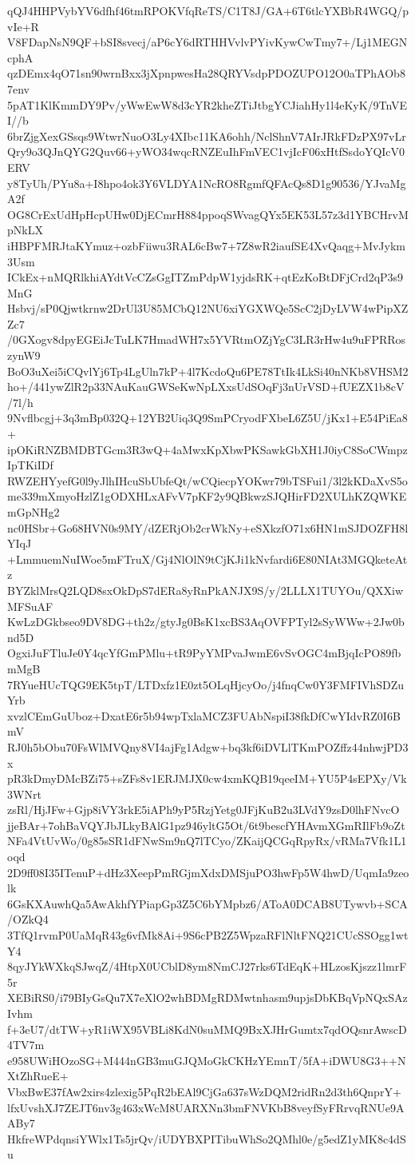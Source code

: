 qQJ4HHPVybYV6dfhf46tmRPOKVfqReTS/C1T8J/GA+6T6tlcYXBbR4WGQ/pvIe+R
V8FDapNsN9QF+bSI8svecj/aP6cY6dRTHHVvlvPYivKywCwTmy7+/Lj1MEGNcphA
qzDEmx4qO71sn90wrnBxx3jXpnpwesHa28QRYVsdpPDOZUPO12O0aTPhAOb87env
5pAT1KlKmmDY9Pv/yWwEwW8d3cYR2kheZTiJtbgYCJiahHy1l4eKyK/9TnVEI//b
6brZjgXexGSsqs9WtwrNuoO3Ly4XIbc11KA6ohh/NclShnV7AIrJRkFDzPX97vLr
Qry9o3QJnQYG2Quv66+yWO34wqcRNZEuIhFmVEC1vjIcF06xHtfSsdoYQIcV0ERV
y8TyUh/PYu8a+I8hpo4ok3Y6VLDYA1NcRO8RgmfQFAcQs8D1g90536/YJvaMgA2f
OG8CrExUdHpHcpUHw0DjECmrH884ppoqSWvagQYx5EK53L57z3d1YBCHrvMpNkLX
iHBPFMRJtaKYmuz+ozbFiiwu3RAL6cBw7+7Z8wR2iaufSE4XvQaqg+MvJykm3Usm
ICkEx+nMQRlkhiAYdtVcCZsGgITZmPdpW1yjdsRK+qtEzKoBtDFjCrd2qP3s9MnG
Hsbvj/sP0Qjwtkrnw2DrUl3U85MCbQ12NU6xiYGXWQe5ScC2jDyLVW4wPipXZZc7
/0GXogv8dpyEGEiJcTuLK7HmadWH7x5YVRtmOZjYgC3LR3rHw4u9uFPRRoszynW9
BoO3uXei5iCQvlYj6Tp4LgUln7kP+4l7KcdoQu6PE78TtIk4LkSi40nNKb8VHSM2
ho+/441ywZlR2p33NAuKauGWSeKwNpLXxsUdSOqFj3nUrVSD+fUEZX1b8cV/7l/h
9Nvflbcgj+3q3mBp032Q+12YB2Uiq3Q9SmPCryodFXbeL6Z5U/jKx1+E54PiEa8+
ipOKiRNZBMDBTGcm3R3wQ+4aMwxKpXbwPKSawkGbXH1J0iyC8SoCWmpzIpTKiIDf
RWZEHYyefG0l9yJlhIHcuSbUbfeQt/wCQiecpYOKwr79bTSFui1/3l2kKDaXvS5o
me339mXmyoHzlZ1gODXHLxAFvV7pKF2y9QBkwzSJQHirFD2XULhKZQWKEmGpNHg2
nc0HSbr+Go68HVN0s9MY/dZERjOb2crWkNy+eSXkzfO71x6HN1mSJDOZFH8lYIqJ
+LmmuemNuIWoe5mFTruX/Gj4NlOlN9tCjKJi1kNvfardi6E80NIAt3MGQketeAtz
BYZklMrsQ2LQD8sxOkDpS7dERa8yRnPkANJX9S/y/2LLLX1TUYOu/QXXiwMFSuAF
KwLzDGkbseo9DV8DG+th2z/gtyJg0BsK1xcBS3AqOVFPTyl2sSyWWw+2Jw0bnd5D
OgxiJuFTluJe0Y4qcYfGmPMlu+tR9PyYMPvaJwmE6vSvOGC4mBjqIcPO89fbmMgB
7RYueHUcTQG9EK5tpT/LTDxfz1E0zt5OLqHjcyOo/j4fnqCw0Y3FMFIVhSDZuYrb
xvzlCEmGuUboz+DxatE6r5b94wpTxlaMCZ3FUAbNspiI38fkDfCwYIdvRZ0I6BmV
RJ0h5bObu70FsWlMVQny8VI4ajFg1Adgw+bq3kf6iDVLlTKmPOZffz44nhwjPD3x
pR3kDmyDMcBZi75+sZFs8v1ERJMJX0cw4xmKQB19qeeIM+YU5P4sEPXy/Vk3WNrt
zsRl/HjJFw+Gjp8iVY3rkE5iAPh9yP5RzjYetg0JFjKuB2u3LVdY9zsD0lhFNvcO
jjeBAr+7ohBaVQYJbJLkyBAlG1pz946yltG5Ot/6t9bescfYHAvmXGmRIlFb9oZt
NFa4VtUvWo/0g85sSR1dFNwSm9nQ7lTCyo/ZKaijQCGqRpyRx/vRMa7Vfk1L1oqd
2D9ff08I35ITenuP+dHz3XeepPmRGjmXdxDMSjuPO3hwFp5W4hwD/UqmIa9zeolk
6GsKXAuwhQa5AwAkhfYPiapGp3Z5C6bYMpbz6/AToA0DCAB8UTywvb+SCA/OZkQ4
3TfQ1rvmP0UaMqR43g6vfMk8Ai+9S6cPB2Z5WpzaRFlNltFNQ21CUcSSOgg1wtY4
8qyJYkWXkqSJwqZ/4HtpX0UCblD8ym8NmCJ27rks6TdEqK+HLzosKjszz1lmrF5r
XEBiRS0/i79BIyGsQu7X7eXlO2whBDMgRDMwtnhasm9upjsDbKBqVpNQxSAzIvhm
f+3eU7/dtTW+yR1iWX95VBLi8KdN0suMMQ9BxXJHrGumtx7qdOQsnrAwscD4TV7m
e958UWiHOzoSG+M444nGB3muGJQMoGkCKHzYEmnT/5fA+iDWU8G3++NXtZhRueE+
VbxBwE37fAw2xirs4zlexig5PqR2bEAl9CjGa637sWzDQM2ridRn2d3th6QnprY+
lfxUvshXJ7ZEJT6nv3g463xWcM8UARXNn3bmFNVKbB8veyfSyFRrvqRNUe9AABy7
HkfreWPdqnsiYWlx1Ts5jrQv/iUDYBXPITibuWhSo2QMhl0e/g5edZ1yMK8c4dSu
